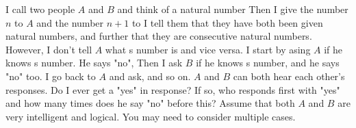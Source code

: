 I call two people $A$ and $B$ and think of a natural number   Then I give the number $n$ to $A$ and the number $n+1$ to   I tell them that they have both been given natural numbers, and further that they are consecutive natural numbers.  However, I don't tell $A$ what s number is and vice versa.  I start by asing $A$ if he knows s number.  He says "no",  Then I ask $B$ if he knows s number, and he says "no" too.  I go back to $A$ and ask, and so on.  $A$ and $B$ can both hear each other's responses.  Do I ever get a "yes" in response?  If so, who responds first with "yes" and how many times does he say "no" before this?  Assume that both $A$ and $B$ are very intelligent and logical.  You may need to consider multiple cases.
